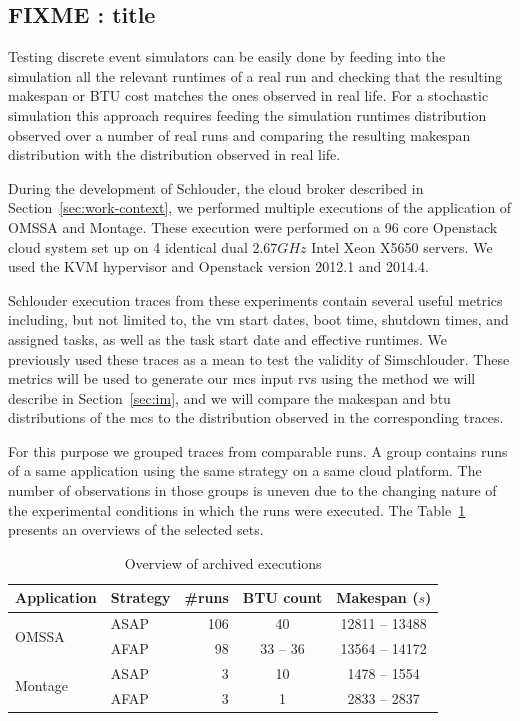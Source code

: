 \documentclass[10pt,conference,compsocconf]{IEEEtran}
\begin{document}
\subsection{FIXME : title}

Testing  discrete event  simulators  can  be easily  done  by  feeding into  the
simulation  all the  relevant  runtimes of  a  real run  and  checking that  the
resulting makespan  or BTU cost  matches the ones observed  in real life.  For a
stochastic  simulation this  approach requires  feeding the  simulation runtimes
distribution observed  over a number  of real  runs and comparing  the resulting
makespan distribution with the distribution observed in real life.

During the development of Schlouder, the cloud broker described in
Section~\ref{sec:work-context}, we performed multiple executions of the
application of OMSSA and Montage. These execution were performed on a 96 core
Openstack cloud system set up on 4 identical dual $2.67GHz$ Intel Xeon X5650
servers. We used the KVM hypervisor and Openstack version 2012.1 and 2014.4.

Schlouder execution traces from these experiments contain several useful metrics
including, but not limited to, the \ac{vm} start dates, boot time, shutdown
times, and assigned tasks, as well as the task start date and effective
runtimes. We previously used these traces as a mean to test the validity of
Simschlouder.  These metrics will be used to generate our \ac{mcs} input
\acp{rv} using the method we will describe in Section~\ref{sec:im}, and we will
compare the makespan and \ac{btu} distributions of the \ac{mcs} to the
distribution observed in the corresponding traces.

For this purpose we grouped traces from comparable runs. A group contains runs
of a same application using the same strategy on a same cloud platform. The
number of observations in those groups is uneven due to the changing nature of the
experimental conditions in which the runs were executed. The
Table~\ref{tab:nbruns} presents an overviews of the selected sets.

\begin{table} \centering \caption{Overview of archived
	executions}\label{tab:nbruns} 
	\begin{tabular}{llrcc} \toprule
		Application&Strategy&\#runs&BTU count&Makespan ($s$)\\
		\midrule 
		\multirow{2}{*}{OMSSA}&ASAP&106&40&12811 -- 13488\\
				      &AFAP&98&33 -- 36&13564 -- 14172\\ 
		\midrule 
		\multirow{2}{*}{Montage}&ASAP&3&10&1478 -- 1554\\
				        &AFAP&3&1&2833 -- 2837\\
		\bottomrule 
	\end{tabular} 
\end{table}
\end{document}
